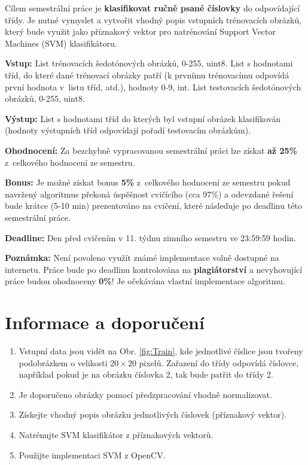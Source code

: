\documentclass[12pt, a4paper]{article}
\begin{document}
\par{Cílem semestrální práce je \textbf{klasifikovat ručně psané číslovky} do odpovídající třídy. Je nutné vymyslet a vytvořit vhodný popis vstupních trénovacích obrázků, který bude využit jako příznakový vektor pro natrénování Support Vector Machines (SVM) klasifikátoru.}

\par{\textbf{Vstup:} List trénovacích šedotónových obrázků, 0-255, uint8. List s hodnotami tříd, do které dané trénovací obrázky patří (k prvnímu trénovacímu odpovídá první hodnota v~listu tříd, atd.), hodnoty 0-9, int. List testovacích šedotónových obrázků, 0-255, uint8.}

\par{\textbf{Výstup:} List s hodnotami tříd do kterých byl vstupní obrázek klasifikován (hodnoty výstupních tříd odpovídají pořadí testovacím obrázkům).}

\par{\textbf{Ohodnocení:} Za bezchybně vypracovanou semestrální práci lze získat \textbf{až 25\%} z~celkového hodnocení ze semestru.}

\par{\textbf{Bonus:} Je možné získat bonus \textbf{5\%} z~celkového hodnocení ze semestru pokud navržený algoritmus překoná úspěšnost cvičícího (cca 97\%) a odevzdané řešení bude krátce (5-10 min) prezentováno na cvičení, které následuje po deadlinu této semestrální práce.}

\par{\textbf{Deadline:} Den před cvičením v 11. týdnu zimního semestru ve 23:59:59 hodin.}

\par{\textbf{Poznámka:} Není povoleno využít známé implementace volně dostupné na internetu. Práce bude po deadlinu kontrolována na \textbf{plagiátorství} a nevyhovující práce budou ohodnoceny \textbf{0\%}! Je očekávána vlastní implementace algoritmu.}

\section*{Informace a doporučení}
\begin{enumerate}
	\item Vstupní data jsou vidět na Obr. \ref{fig:Train}, kde jednotlivé číslice jsou tvořeny podobrázkem o velikosti $20 \times 20$ pixelů. Zařazení do třídy odpovídá číslovce, například pokud je na obrázku číslovka 2, tak bude patřit do třídy 2.
	\item Je doporučeno obrázky pomocí předzpracování vhodně normalizovat.
	\item Získejte vhodný popis obrázku jednotlivých číslovek (příznakový vektor).
	\item Natrénujte SVM klasifikátor z příznakových vektorů.
	\item Použijte implementaci SVM z OpenCV.
\end{enumerate}
\end{document}
